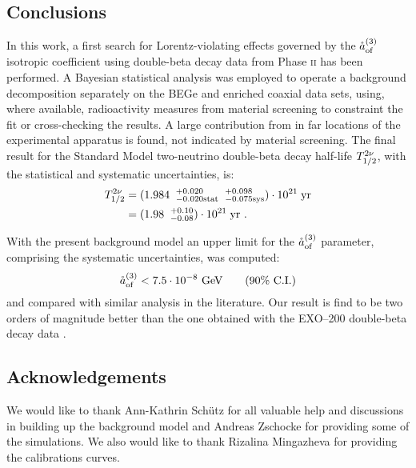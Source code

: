 \subsection*{Conclusions}
In this work, a first search for Lorentz-violating effects governed by the $\mathring{a}_\text{of}^{(3)}$ isotropic coefficient using double-beta decay data from {\gerda} Phase \textsc{ii} has been performed. A Bayesian statistical analysis was employed to operate a background decomposition separately on the BEGe and enriched coaxial data sets, using, where available, radioactivity measures from material screening to constraint the fit or cross-checking the results. A large contribution from  in far locations of the experimental apparatus is found, not indicated by material screening. The final result for the Standard Model two-neutrino double-beta decay half-life $T_{1/2}^{2\nu}$, with the statistical and systematic uncertainties, is:
\begin{equation}
	\begin{split}
		T_{1/2}^{2\nu} &=({1.984\;\;^{+0.020}_{-0.020\text{stat}}}\;\;{^{+0.098}_{-0.075\text{sys}}})\cdot10^{21}\;\text{yr}\\
				   &=(1.98\;\;^{+0.10}_{-0.08})\cdot10^{21}\;\text{yr}\ .\\
	\end{split}
\end{equation}

With the present background model an upper limit for the $\mathring{a}_\text{of}^{(3)}$ parameter, comprising the systematic uncertainties, was computed:
\begin{equation}\mathring{a}_\text{of}^{(3)}<7.5\cdot10^{-8}\ \text{GeV}\qquad(\text{90\% C.I.})\end{equation}
and compared with similar analysis in the literature. Our result is find to be two orders of magnitude better than the one obtained with the EXO--200 double-beta decay data \cite{exo200}.
\vspace*{4cm}
\subsection*{Acknowledgements}
We would like to thank Ann-Kathrin Schütz for all valuable help and discussions in building up the background model and Andreas Zschocke for providing some of the simulations. We also would like to thank Rizalina Mingazheva for providing the calibrations curves.

